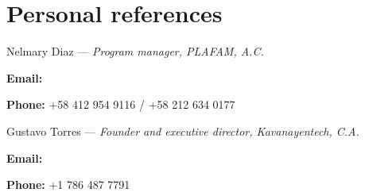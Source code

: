 \documentclass[xcolor=svgnames,color=DarkSlateGray,draft=false]{komacv}
\begin{document}
\section{Personal references}
\enlargethispage{2\baselineskip}
        \begin{compactdesc}
                \item{Nelmary Diaz — }{\em Program manager, PLAFAM, A.C.}
                \item{\bfseries Email:} 
                \item{\bfseries Phone:} +58 412 954 9116 / +58 212 634 0177
        \end{compactdesc}

\medskip

        \begin{compactdesc}
                \item{Gustavo Torres — }{\em Founder and executive director, Kavanayentech, C.A.}
                \item{\bfseries Email:} 
                \item{\bfseries Phone:} +1 786 487 7791
        \end{compactdesc}
\end{document}
